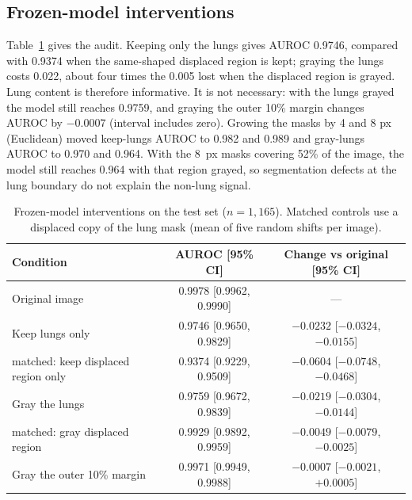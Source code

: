 \subsection{Frozen-model interventions}
Table~\ref{tab:audit} gives the audit. Keeping only the lungs gives AUROC 0.9746, compared with 0.9374 when the
same-shaped displaced region is kept; graying the lungs costs 0.022, about four times the 0.005 lost when the
displaced region is grayed. Lung content is therefore informative. It is not necessary: with the lungs grayed
the model still reaches 0.9759, and graying the outer 10\% margin changes AUROC by $-0.0007$ (interval
includes zero). Growing the masks by 4 and 8 px (Euclidean) moved keep-lungs AUROC to 0.982 and 0.989 and
gray-lungs AUROC to 0.970 and 0.964. With the 8~px masks covering 52\% of the image, the model still reaches
0.964 with that region grayed, so segmentation defects at the lung boundary do not explain the non-lung signal.

\begin{table}[htbp]
\centering
\caption{Frozen-model interventions on the test set ($n=1{,}165$). Matched controls use a displaced copy of
the lung mask (mean of five random shifts per image).}
\label{tab:audit}
\small
\begin{tabular}{lcc}
\toprule
Condition & AUROC [95\% CI] & Change vs original [95\% CI] \\
\midrule
Original image & 0.9978 [0.9962, 0.9990] & --- \\
Keep lungs only & 0.9746 [0.9650, 0.9829] & $-0.0232$ [$-0.0324$, $-0.0155$] \\
\quad matched: keep displaced region only & 0.9374 [0.9229, 0.9509] & $-0.0604$ [$-0.0748$, $-0.0468$] \\
Gray the lungs & 0.9759 [0.9672, 0.9839] & $-0.0219$ [$-0.0304$, $-0.0144$] \\
\quad matched: gray displaced region & 0.9929 [0.9892, 0.9959] & $-0.0049$ [$-0.0079$, $-0.0025$] \\
Gray the outer 10\% margin & 0.9971 [0.9949, 0.9988] & $-0.0007$ [$-0.0021$, $+0.0005$] \\
\bottomrule
\end{tabular}
\end{table}

